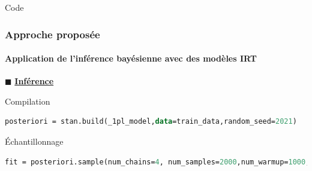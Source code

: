 \documentclass[aspectratio=169,professionalfonts, 12pt]{beamer}
\begin{document}
\begin{frame}[fragile]{Code}
  \frametitle{Approche proposée}
  \framesubtitle{Application de l'inférence bayésienne avec des modèles IRT}
  \(\displaystyle \blacksquare \) \textbf{\underline{ Inférence }}

  \justifying 
  \begin{minipage}{\textwidth}
  \begin{block}{Compilation}
    \begin{lstlisting}[language=Stan,basicstyle=\small,framesep=4.5mm,framexleftmargin=2.5mm,tabsize=2]
      posteriori = stan.build(_1pl_model,data=train_data,random_seed=2021)
    \end{lstlisting}
  \end{block}
  \begin{block}{\'Echantillonnage}
    \begin{lstlisting}[language=Stan,basicstyle=\small,framesep=4.5mm,framexleftmargin=2.5mm,tabsize=2]
      fit = posteriori.sample(num_chains=4, num_samples=2000,num_warmup=1000,num_thin=1)
    \end{lstlisting}
  \end{block}
  \end{minipage}
\end{frame}

 

\end{document}
